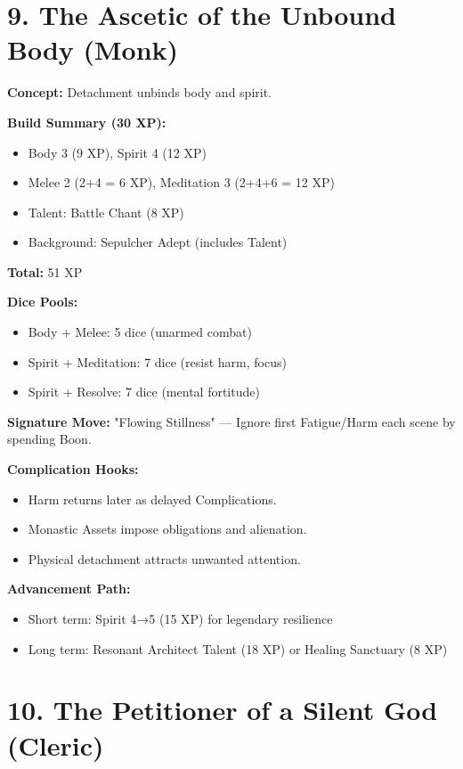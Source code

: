 \begin{itemize}
\section{9. The Ascetic of the Unbound Body (Monk)}

\textbf{Concept:} Detachment unbinds body and spirit.

\textbf{Build Summary (30 XP):}
\begin{itemize}
  \item Body 3 (9 XP), Spirit 4 (12 XP)
  \item Melee 2 (2+4 = 6 XP), Meditation 3 (2+4+6 = 12 XP)
  \item Talent: Battle Chant (8 XP)
  \item Background: Sepulcher Adept (includes Talent)
\end{itemize}
\textbf{Total:} 51 XP

\textbf{Dice Pools:}
\begin{itemize}
  \item Body + Melee: 5 dice (unarmed combat)
  \item Spirit + Meditation: 7 dice (resist harm, focus)
  \item Spirit + Resolve: 7 dice (mental fortitude)
\end{itemize}

\textbf{Signature Move:} "Flowing Stillness" — Ignore first Fatigue/Harm each scene by spending Boon.

\textbf{Complication Hooks:}
\begin{itemize}
  \item Harm returns later as delayed Complications.
  \item Monastic Assets impose obligations and alienation.
  \item Physical detachment attracts unwanted attention.
\end{itemize}

\textbf{Advancement Path:}
\begin{itemize}
  \item Short term: Spirit 4→5 (15 XP) for legendary resilience
  \item Long term: Resonant Architect Talent (18 XP) or Healing Sanctuary (8 XP)
\end{itemize}

\section{10. The Petitioner of a Silent God (Cleric)}


\end{itemize}
